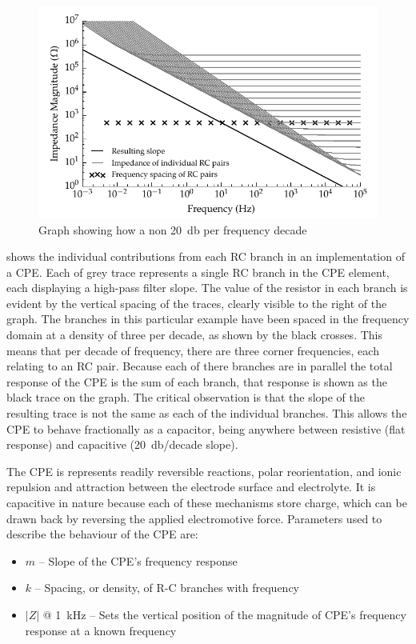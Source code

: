       \begin{figure}
        \centering
        \includegraphics{content/pt2/07-InterfaceModel/graphics/graph_cpe_creation}
        \caption{\label{graph:pt2-cpe_creation}Graph showing how a non \SI{20}{\decibel} per frequency decade}
      \end{figure}

       shows the individual contributions from each RC branch in an implementation of a CPE.
      Each of grey trace represents a single RC branch in the CPE element, each displaying a high-pass filter slope.
      The value of the resistor in each branch is evident by the vertical spacing of the traces, clearly visible to the right of the graph.
      The branches in this particular example have been spaced in the frequency domain at a density of three per decade, as shown by the black crosses.
      This means that per decade of frequency, there are three corner frequencies, each relating to an RC pair.
      Because each of there branches are in parallel the total response of the CPE is the sum of each branch, that response is shown as the black trace on the graph.
      The critical observation is that the slope of the resulting trace is not the same as each of the individual branches.
      This allows the CPE to behave fractionally as a capacitor, being anywhere between resistive (flat response) and capacitive (\SI{20}{\decibel}/decade slope).

      The CPE is represents readily reversible reactions, polar reorientation, and ionic repulsion and attraction between the electrode surface and electrolyte.
      It is capacitive in nature because each of these mechanisms store charge, which can be drawn back by reversing the applied electromotive force.
      Parameters used to describe the behaviour of the CPE are:
      \begin{itemize}
        \item $m$ -- Slope of the CPE's frequency response
        \item $k$ -- Spacing, or density, of R-C branches with frequency
        \item $|Z|$ @ \SI{1}{\kilo\hertz} -- Sets the vertical position of the magnitude of CPE's frequency response at a known frequency
      \end{itemize}



